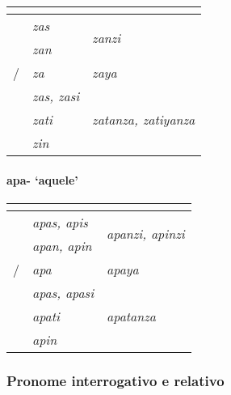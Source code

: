 \begin{center}
	\begin{tabular}[c]{lll}
		\toprule
		                 & \Sg{}\emph{}     & \Pl{}\emph{}                    \\
		\midrule
		\Nom{} \Com{}    & \emph{zas}       & \multirow{2}{4em}{\emph{zanzi}} \\
		\Acu{} \Com{}    & \emph{zan}       &                                 \\
		\Nom/\Acu\Neut{} & \emph{za}        & \emph{zaya}                     \\
		\Gen{}           & \emph{zas, zasi} &                                 \\
		\Dat{}           & \emph{zati}      & \emph{zatanza, zatiyanza}       \\
		\Abl{}           & \emph{zin}       & \emph{}                         \\
		\bottomrule
	\end{tabular}
\end{center}

\clearpage
\paragraph{apa- `aquele'}

\begin{center}
	\begin{tabular}[c]{lll}
		\toprule
		                 & \Sg{}\emph{}       & \Pl{}\emph{}                             \\
		\midrule
		\Nom{} \Com{}    & \emph{apas, apis}  & \multirow{2}{4em}{\emph{apanzi, apinzi}} \\
		\Acu{} \Com{}    & \emph{apan, apin}  &                                          \\
		\Nom/\Acu\Neut{} & \emph{apa}         & \emph{apaya}                             \\
		\Gen{}           & \emph{apas, apasi} &                                          \\
		\Dat{}           & \emph{apati}       & \emph{apatanza}                          \\
		\Abl{}           & \emph{apin}        & \emph{}                                  \\
		\bottomrule
	\end{tabular}
\end{center}

\subsubsection{Pronome interrogativo e relativo}

